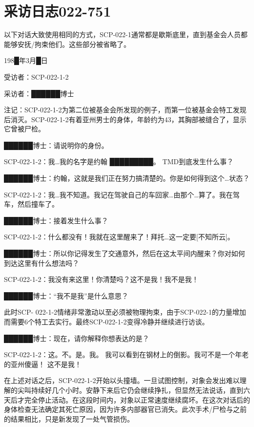 \section{采访日志022-751}

\label{sec:DOC-interview-log-022-751}

以下对话大致使用相同的方式，SCP-022-1通常都是歇斯底里，直到基金会人员都能够安抚\slash 拘束他们。这些部分被省略了。

198█年3月█日

受访者：SCP-022-1-2

采访者：██████博士

注记：SCP-022-1-2为第二位被基金会所发现的例子，而第一位被基金会特工发现后消灭。SCP-022-1-2有着亚州男士的身体，年龄约为43，其胸部被缝合了，显示它曾被尸检。

\begin{scpbox}

\bb{[对话开始]}

██████博士：请说明你的身份。

SCP-022-1-2：我…我的名字是约翰 █████████。 TMD到底发生什么事？

██████博士：约翰，这就是我们正在努力搞清楚的。你是如何得到这个…状态？

SCP-022-1-2：我…我不知道。我记在驾驶自己的车回家…由那个…算了。我在驾车，然后撞车了。

██████博士：接着发生什么事？

SCP-022-1-2：什么都没有！我就在这里醒来了！拜托…这一定要[不知所云]。

██████博士：所以你记得发生了交通意外，然后在这太平间内醒来？你对如何到达这里有什么想法吗？

SCP-022-1-2：我没有来这里！你清楚吗？这不是我！我不是我！

██████博士：“我不是我”是什么意思？

此时SCP- 022-1-2情绪非常激动以至必须被物理拘束，由于SCP-022-1的力量增加而需要6个特工去实行。最终SCP-022-1-2变得冷静并继续进行访谈。

██████博士：现在，请你解释你想表达的是？

SCP-022-1-2：这。不。是。我。 我可以看到在钢材上的倒影。我可不是一个年老的亚州傻逼！ 这不是我！

\bb{[对话结束]}

\end{scpbox}

在上述对话之后，SCP-022-1-2开始以头撞墙。一旦试图控制，对象会发出难以理解的尖叫持续好几个小时。安静下来后它仍会继续挣扎，但显然无法说话，直到六天后才完全停止活动。在这段时间内，对象以正常速度继续腐坏。在这次对话后的身体检查无法确定其死亡原因，因为许多内部器官已消失。此次手术\slash 尸检与之前的结果相比，只是新发现了一处气管损伤。

